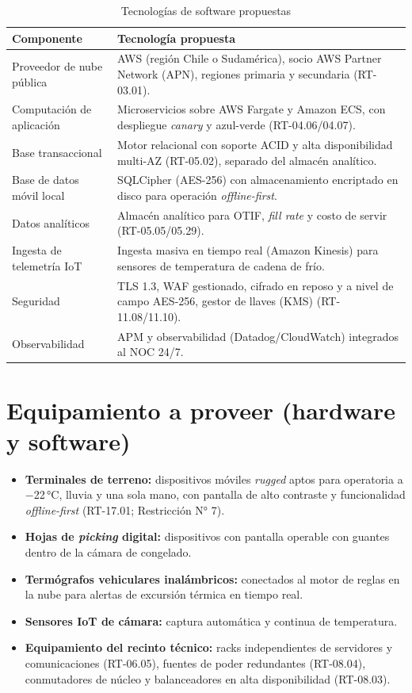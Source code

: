 \begin{table}[htbp]
\centering
\small
\caption{Tecnologías de software propuestas}
\label{tab:software}
\begin{tabularx}{\textwidth}{@{}L{5.2cm}X@{}}
\toprule
\textbf{Componente} & \textbf{Tecnología propuesta} \\
\midrule
Proveedor de nube pública &
AWS (región Chile o Sudamérica), socio AWS Partner Network (APN), regiones primaria y
secundaria (RT-03.01). \\
\addlinespace
Computación de aplicación &
Microservicios sobre AWS Fargate y Amazon ECS, con despliegue \emph{canary} y
azul-verde (RT-04.06/04.07). \\
\addlinespace
Base transaccional &
Motor relacional con soporte ACID y alta disponibilidad multi-AZ (RT-05.02), separado del
almacén analítico. \\
\addlinespace
Base de datos móvil local &
SQLCipher (AES-256) con almacenamiento encriptado en disco para operación
\emph{offline-first}. \\
\addlinespace
Datos analíticos &
Almacén analítico para OTIF, \emph{fill rate} y costo de servir (RT-05.05/05.29). \\
\addlinespace
Ingesta de telemetría IoT &
Ingesta masiva en tiempo real (Amazon Kinesis) para sensores de temperatura de cadena de
frío. \\
\addlinespace
Seguridad &
TLS 1.3, WAF gestionado, cifrado en reposo y a nivel de campo AES-256, gestor de llaves
(KMS) (RT-11.08/11.10). \\
\addlinespace
Observabilidad &
APM y observabilidad (Datadog/CloudWatch) integrados al NOC 24/7. \\
\bottomrule
\end{tabularx}
\end{table}

\section{Equipamiento a proveer (hardware y software)}

\begin{itemize}
  \item \textbf{Terminales de terreno:} dispositivos móviles \emph{rugged} aptos para
        operatoria a $-$22\,°C, lluvia y una sola mano, con pantalla de alto contraste y
        funcionalidad \emph{offline-first} (RT-17.01; Restricción N° 7).
  \item \textbf{Hojas de \emph{picking} digital:} dispositivos con pantalla operable con
        guantes dentro de la cámara de congelado.
  \item \textbf{Termógrafos vehiculares inalámbricos:} conectados al motor de reglas en
        la nube para alertas de excursión térmica en tiempo real.
  \item \textbf{Sensores IoT de cámara:} captura automática y continua de temperatura.
  \item \textbf{Equipamiento del recinto técnico:} racks independientes de servidores y
        comunicaciones (RT-06.05), fuentes de poder redundantes (RT-08.04), conmutadores
        de núcleo y balanceadores en alta disponibilidad (RT-08.03).
\end{itemize}

